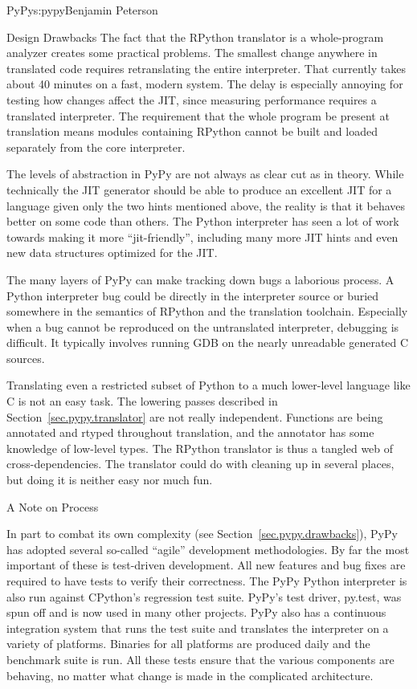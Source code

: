 \begin{aosachapter}{PyPy}{s:pypy}{Benjamin Peterson}
\begin{aosasect1}{Design Drawbacks}
The fact that the RPython translator is a whole-program analyzer creates some
practical problems. The smallest change anywhere in translated code requires
retranslating the entire interpreter. That currently takes about 40 minutes on a
fast, modern system. The delay is especially annoying for testing how changes
affect the JIT, since measuring performance requires a translated
interpreter. The requirement that the whole program be present at translation
means modules containing RPython cannot be built and loaded separately from the
core interpreter.

The levels of abstraction in PyPy are not always as clear cut as in
theory. While technically the JIT generator should be able to produce an
excellent JIT for a language given only the two hints mentioned above, the
reality is that it behaves better on some code than others. The Python
interpreter has seen a lot of work towards making it more ``jit-friendly'',
including many more JIT hints and even new data structures optimized for the
JIT.

The many layers of PyPy can make tracking down bugs a laborious process. A
Python interpreter bug could be directly in the interpreter source or buried
somewhere in the semantics of RPython and the translation toolchain. Especially
when a bug cannot be reproduced on the untranslated interpreter, debugging is
difficult. It typically involves running GDB on the nearly unreadable generated
C sources.

Translating even a restricted subset of Python to a much lower-level language
like C is not an easy task. The lowering passes described in
Section~\ref{sec.pypy.translator} are not really independent. Functions are being
annotated and rtyped throughout translation, and the annotator has some
knowledge of low-level types. The RPython translator is thus a tangled web of
cross-dependencies. The translator could do with cleaning up in several places,
but doing it is neither easy nor much fun.

\end{aosasect1}

\begin{aosasect1}{A Note on Process}

In part to combat its own complexity (see Section~\ref{sec.pypy.drawbacks}), PyPy
has adopted several so-called ``agile'' development methodologies. By far the
most important of these is test-driven development. All new features and bug
fixes are required to have tests to verify their correctness. The PyPy Python
interpreter is also run against CPython's regression test suite. PyPy's test
driver, py.test, was spun off and is now used in many other projects. PyPy also
has a continuous integration system that runs the test suite and translates the
interpreter on a variety of platforms. Binaries for all platforms are produced
daily and the benchmark suite is run. All these tests ensure that the various
components are behaving, no matter what change is made in the complicated
architecture.


\end{aosasect1}
\end{aosachapter}
